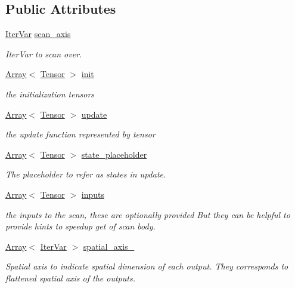 \subsection*{Public Attributes}
\begin{DoxyCompactItemize}
\item 
\hyperlink{classtvm_1_1tir_1_1IterVar}{Iter\+Var} \hyperlink{classtvm_1_1te_1_1ScanOpNode_a9c67e6383696efbba8e1ff9bd7470c8a}{scan\+\_\+axis}
\begin{DoxyCompactList}\small\item\em Iter\+Var to scan over. \end{DoxyCompactList}\item 
\hyperlink{classtvm_1_1Array}{Array}$<$ \hyperlink{classtvm_1_1te_1_1Tensor}{Tensor} $>$ \hyperlink{classtvm_1_1te_1_1ScanOpNode_a729243cd385db2e3f74c3a92a44db935}{init}
\begin{DoxyCompactList}\small\item\em the initialization tensors \end{DoxyCompactList}\item 
\hyperlink{classtvm_1_1Array}{Array}$<$ \hyperlink{classtvm_1_1te_1_1Tensor}{Tensor} $>$ \hyperlink{classtvm_1_1te_1_1ScanOpNode_ace2bf7e43cd4197324ec6363626fc60a}{update}
\begin{DoxyCompactList}\small\item\em the update function represented by tensor \end{DoxyCompactList}\item 
\hyperlink{classtvm_1_1Array}{Array}$<$ \hyperlink{classtvm_1_1te_1_1Tensor}{Tensor} $>$ \hyperlink{classtvm_1_1te_1_1ScanOpNode_a69105f6a84dd4fb912a16bfaa68aebf6}{state\+\_\+placeholder}
\begin{DoxyCompactList}\small\item\em The placeholder to refer as states in update. \end{DoxyCompactList}\item 
\hyperlink{classtvm_1_1Array}{Array}$<$ \hyperlink{classtvm_1_1te_1_1Tensor}{Tensor} $>$ \hyperlink{classtvm_1_1te_1_1ScanOpNode_abcc62af0d7da8d97d9065fd82230162b}{inputs}
\begin{DoxyCompactList}\small\item\em the inputs to the scan, these are optionally provided But they can be helpful to provide hints to speedup get of scan body. \end{DoxyCompactList}\item 
\hyperlink{classtvm_1_1Array}{Array}$<$ \hyperlink{classtvm_1_1tir_1_1IterVar}{Iter\+Var} $>$ \hyperlink{classtvm_1_1te_1_1ScanOpNode_ab52af0e689bd723c0a9c853c78a8bc78}{spatial\+\_\+axis\+\_\+}
\begin{DoxyCompactList}\small\item\em Spatial axis to indicate spatial dimension of each output. They corresponds to flattened spatial axis of the outputs. \end{DoxyCompactList}\end{DoxyCompactItemize}
